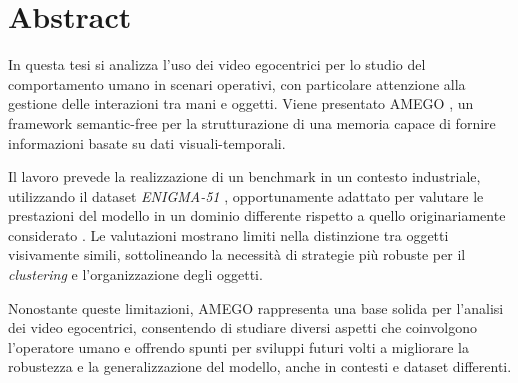 \chapter*{Abstract} %

In questa tesi si analizza l'uso dei video egocentrici per lo studio del comportamento umano in scenari operativi, con particolare attenzione alla gestione delle interazioni tra mani e oggetti. Viene presentato AMEGO \cite{goletto2024amego}, un framework semantic-free per la strutturazione di una memoria capace di fornire informazioni basate su dati visuali-temporali.

Il lavoro prevede la realizzazione di un benchmark in un contesto industriale, utilizzando il dataset \textit{ENIGMA-51} \cite{ragusa2023enigma51}, opportunamente adattato per valutare le prestazioni del modello in un dominio differente rispetto a quello originariamente considerato \cite{Damen2021PAMI}. Le valutazioni mostrano limiti nella distinzione tra oggetti visivamente simili, sottolineando la necessità di strategie più robuste per il \textit{clustering} e l'organizzazione degli oggetti.

Nonostante queste limitazioni, AMEGO rappresenta una base solida per l'analisi dei video egocentrici, consentendo di studiare diversi aspetti che coinvolgono l'operatore umano e offrendo spunti per sviluppi futuri volti a migliorare la robustezza e la generalizzazione del modello, anche in contesti e dataset differenti.